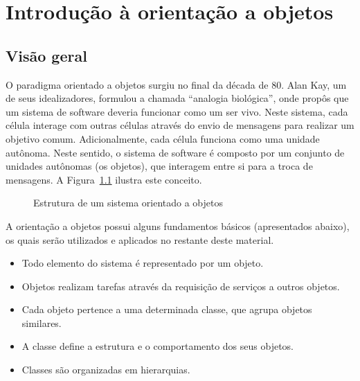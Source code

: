 \chapter{Introdução à orientação a objetos}

\section{Visão geral}
O paradigma orientado a objetos surgiu no final da década de 80. Alan Kay, um de seus idealizadores, formulou a chamada ``analogia biológica'', onde propôs que um sistema de software deveria funcionar como um ser vivo. Neste sistema, cada célula interage com outras células através do envio de mensagens para realizar um objetivo comum. Adicionalmente, cada célula funciona como uma unidade autônoma. Neste sentido, o sistema de software é composto por um conjunto de unidades autônomas (os objetos), que interagem entre si para a troca de mensagens. A Figura~\ref{fig:poo-metafora} ilustra este conceito.


\begin{figure}[h]
	\centering
	\caption{Estrutura de um sistema orientado a objetos}
	\label{fig:poo-metafora}
\end{figure}

A orientação a objetos possui alguns fundamentos básicos (apresentados abaixo), os quais serão utilizados e aplicados no restante deste material.

\begin{itemize}
	\item Todo elemento do sistema é representado por um objeto.
	\item Objetos realizam tarefas através da requisição de serviços a outros objetos.
	\item Cada objeto pertence a uma determinada classe, que agrupa objetos similares.
	\item A classe define a estrutura e o comportamento dos seus objetos.
	\item Classes são organizadas em hierarquias.
\end{itemize}

